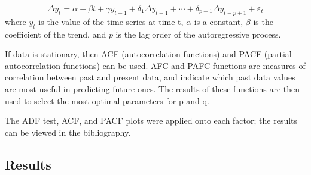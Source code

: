 \begin{equation}
    \Delta y_{t}=\alpha +\beta t+\gamma y_{t-1}+\delta _{1}\Delta y_{t-1}+\cdots +\delta _{p-1}\Delta y_{t-p+1}+\varepsilon _{t}
\end{equation}
%
where
${y_{t}}$ is the value of the time series at time t,
${\alpha}$ is a constant,
${\beta}$ is the coefficient of the trend, and
$p$ is the lag order of the autoregressive process.

If data is stationary, then ACF (autocorrelation functions) and PACF (partial autocorrelation functions) can be used.
AFC and PAFC functions are measures of correlation between past
and present data, and indicate which past data values are most useful in predicting future
ones. The results of these functions are then used to select the most optimal parameters for
p and q.

The ADF test, ACF, and PACF plots were applied onto each factor; the results can be viewed in the bibliography.

\subsection{Results}

